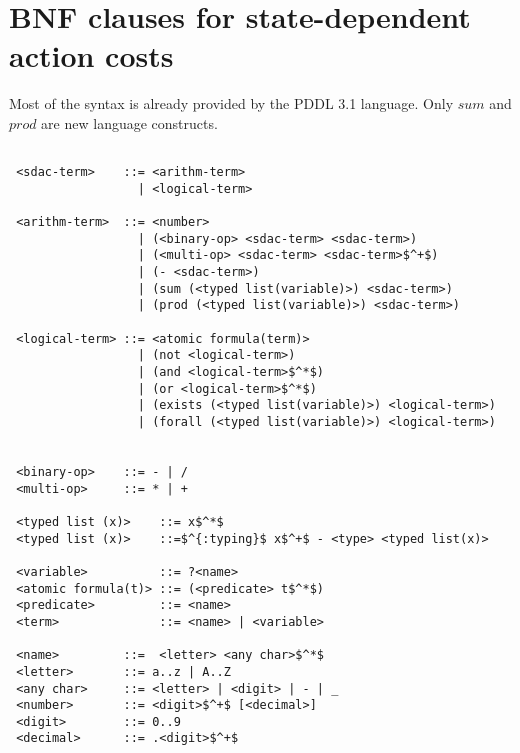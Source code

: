 \documentclass[letterpaper]{article}
\begin{document}
\section*{BNF clauses for state-dependent action costs}
Most of the syntax is already provided by the PDDL 3.1 language. Only $sum$ and
$prod$ are new language constructs.

\begin{lstlisting}

 <sdac-term>    ::= <arithm-term>
                  | <logical-term>

 <arithm-term>  ::= <number>
                  | (<binary-op> <sdac-term> <sdac-term>)
                  | (<multi-op> <sdac-term> <sdac-term>$^+$)
                  | (- <sdac-term>)
                  | (sum (<typed list(variable)>) <sdac-term>)
                  | (prod (<typed list(variable)>) <sdac-term>)

 <logical-term> ::= <atomic formula(term)>
                  | (not <logical-term>)
                  | (and <logical-term>$^*$)
                  | (or <logical-term>$^*$)
                  | (exists (<typed list(variable)>) <logical-term>)
                  | (forall (<typed list(variable)>) <logical-term>)


 <binary-op>    ::= - | /
 <multi-op>     ::= * | +

 <typed list (x)>    ::= x$^*$
 <typed list (x)>    ::=$^{:typing}$ x$^+$ - <type> <typed list(x)>

 <variable>          ::= ?<name>
 <atomic formula(t)> ::= (<predicate> t$^*$)
 <predicate>         ::= <name>
 <term>              ::= <name> | <variable>

 <name>         ::=  <letter> <any char>$^*$
 <letter>       ::= a..z | A..Z
 <any char>     ::= <letter> | <digit> | - | _
 <number>       ::= <digit>$^+$ [<decimal>]
 <digit>        ::= 0..9
 <decimal>      ::= .<digit>$^+$


\end{lstlisting}
\end{document}
